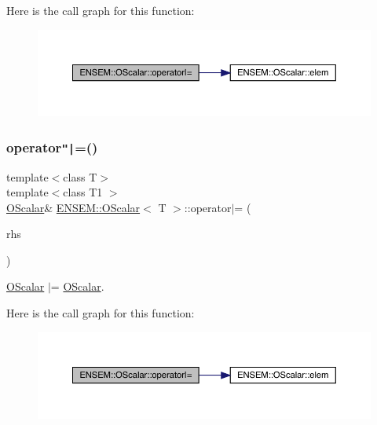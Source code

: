 Here is the call graph for this function\+:
\nopagebreak
\begin{figure}[H]
\begin{center}
\leavevmode
\includegraphics[width=350pt]{da/d80/classENSEM_1_1OScalar_aeffba612ea04593253d41332d6d2aa82_cgraph}
\end{center}
\end{figure}
\mbox{\label{classENSEM_1_1OScalar_aeffba612ea04593253d41332d6d2aa82}} 
\subsubsection{\texorpdfstring{operator\texttt{"|}=()}{operator|=()}\hspace{0.1cm}{\footnotesize\ttfamily [3/3]}}
{\footnotesize\ttfamily template$<$class T$>$ \\
template$<$class T1 $>$ \\
\mbox{\hyperlink{classENSEM_1_1OScalar}{O\+Scalar}}\& \mbox{\hyperlink{classENSEM_1_1OScalar}{E\+N\+S\+E\+M\+::\+O\+Scalar}}$<$ T $>$\+::operator$\vert$= (\begin{DoxyParamCaption}\item[{const \mbox{\hyperlink{classENSEM_1_1OScalar}{O\+Scalar}}$<$ T1 $>$ \&}]{rhs }\end{DoxyParamCaption})\hspace{0.3cm}{\ttfamily [inline]}}



\mbox{\hyperlink{classENSEM_1_1OScalar}{O\+Scalar}} $\vert$= \mbox{\hyperlink{classENSEM_1_1OScalar}{O\+Scalar}}. 

Here is the call graph for this function\+:
\nopagebreak
\begin{figure}[H]
\begin{center}
\leavevmode
\includegraphics[width=350pt]{da/d80/classENSEM_1_1OScalar_aeffba612ea04593253d41332d6d2aa82_cgraph}
\end{center}
\end{figure}
\mbox{\label{classENSEM_1_1OScalar_ab7d5b96a7f1a3451bedd04eda3169c84}} 
